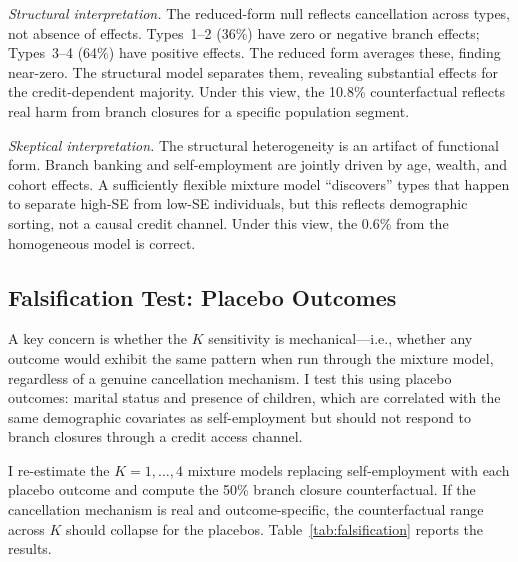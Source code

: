 \documentclass[12pt]{article}
\begin{document}
\textit{Structural interpretation.} The reduced-form null reflects cancellation across types, not absence of effects. Types~1--2 (36\%) have zero or negative branch effects; Types~3--4 (64\%) have positive effects. The reduced form averages these, finding near-zero. The structural model separates them, revealing substantial effects for the credit-dependent majority. Under this view, the 10.8\% counterfactual reflects real harm from branch closures for a specific population segment.

\textit{Skeptical interpretation.} The structural heterogeneity is an artifact of functional form. Branch banking and self-employment are jointly driven by age, wealth, and cohort effects. A sufficiently flexible mixture model ``discovers'' types that happen to separate high-SE from low-SE individuals, but this reflects demographic sorting, not a causal credit channel. Under this view, the 0.6\% from the homogeneous model is correct.

\subsection{Falsification Test: Placebo Outcomes}
\label{subsec:falsification}

A key concern is whether the $K$ sensitivity is mechanical---i.e., whether any outcome would exhibit the same pattern when run through the mixture model, regardless of a genuine cancellation mechanism. I test this using placebo outcomes: marital status and presence of children, which are correlated with the same demographic covariates as self-employment but should not respond to branch closures through a credit access channel.

I re-estimate the $K = 1, \ldots, 4$ mixture models replacing self-employment with each placebo outcome and compute the 50\% branch closure counterfactual. If the cancellation mechanism is real and outcome-specific, the counterfactual range across $K$ should collapse for the placebos. Table~\ref{tab:falsification} reports the results.
\end{document}
